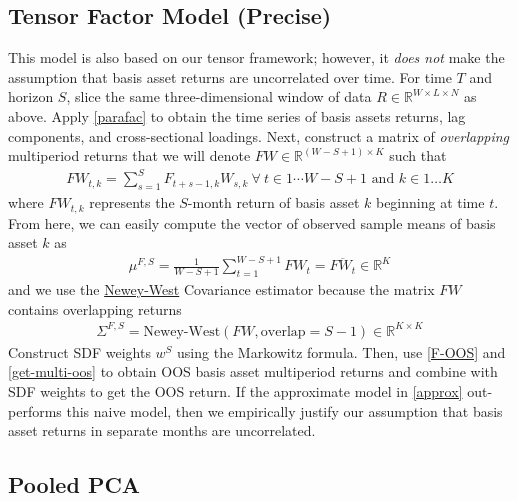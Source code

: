 \documentclass{article}
\newcommand{\R}{{\mathbb R}}
\begin{document}
\subsection{Tensor Factor Model (Precise)} \label{precise}

This model is also based on our tensor framework; however, it \emph{does not} make the assumption that basis asset returns are uncorrelated
over time. For time $T$ and horizon $S$, slice the same three-dimensional window of data $R \in \R^{W \times L \times N}$ as above. Apply \ref{parafac} to obtain 
the time series of basis assets returns, lag components, and cross-sectional loadings. Next, construct a 
matrix of \emph{overlapping} multiperiod returns that we will denote $FW \in \R^{(W-S+1) \times K}$ such that 
\begin{align}
    FW_{t, k} = \sum_{s=1}^S F_{t+s-1, k}W_{s, k} \ \forall \ t \in 1 \cdots W - S+1 \text{ and } k \in 1 \ldots K \label{orig-FW-naive}
\end{align}
where $FW_{t, k}$ represents the $S$-month return of basis asset $k$ beginning at time $t$. 
From here, we can easily compute the vector of observed sample means of basis asset $k$ as 
\begin{align}
    \mu^{F, S} = \frac{1}{W-S+1} \sum_{t=1}^{W-S+1} FW_{t} = \overline{FW_t} \in \R^K
\end{align}
and we use the \href{https://www.hbs.edu/research-computing-services/Shared%20Documents/Training/hac.pdf}{Newey-West} Covariance estimator because the matrix $FW$ contains overlapping returns
\begin{align}
    \Sigma^{F, S} = \text{Newey-West}(FW, \text{overlap}=S-1) \in \R^{K \times K}
\end{align}
Construct SDF weights $w^S$ using the Markowitz formula. Then, use \ref{F-OOS} and \ref{get-multi-oos} to obtain OOS basis asset multiperiod returns
and combine with SDF weights to get the OOS return. If the approximate model in \ref{approx} out-performs this naive model, then 
we empirically justify our assumption that basis asset returns in separate months are uncorrelated.

\subsection{Pooled PCA} \label{pooled-pca}
\end{document}
